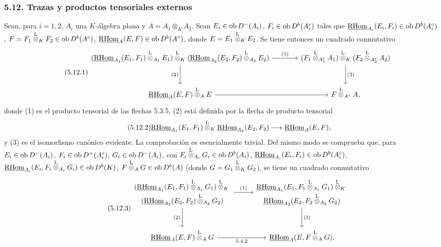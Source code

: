 \subsubsection*{5.12. Trazas y productos tensoriales externos}

Sean, para $i=1,2$, $A_i$ una $K$-álgebra plana y $A=A_1\otimes_KA_2$. Sean $E_i\in\operatorname{ob} D^-(A_i)$, $F_i\in\operatorname{ob} D^b(A_i^e)$ tales que $\underline{\mathrm{RHom}}_{A_i}(E_i,F_i)\in\operatorname{ob} D^b(A_i^\circ)$, $F=F_1\overset{\mathrm L}{\otimes}_KF_2\in\operatorname{ob} D^b(A^e)$, $\underline{\mathrm{RHom}}_A(E,F)\in\operatorname{ob} D^b(A^\circ)$, donde $E=E_1\overset{\mathrm L}{\otimes}_KE_2$. Se tiene entonces un cuadrado conmutativo
\begin{equation}\tag{5.12.1}
\begin{tikzcd}[column sep=large,row sep=large]
(\uRHom_{A_1}(E_1,F_1)\lten_{A_1}E_1)\lten_K(\uRHom_{A_2}(E_2,F_2)\lten_{A_2}E_2) \arrow[r,"(1)"] \arrow[d,"(2)"'] & (F_1\lten_{A_1^e}A_1)\lten_K(F_2\lten_{A_2^e}A_2) \arrow[d,"(3)"]\\
\uRHom_A(E,F)\lten_AE \arrow[r] & F\lten_{A^e}A,
\end{tikzcd}
\end{equation}
donde (1) es el producto tensorial de las flechas 5.3.5, (2) está definida por la flecha de producto tensorial
\begin{equation}\tag{5.12.2}
\underline{\mathrm{RHom}}_{A_1}(E_1,F_1)\overset{\mathrm L}{\otimes}_K\underline{\mathrm{RHom}}_{A_2}(E_2,F_2)\longrightarrow\underline{\mathrm{RHom}}_A(E,F),
\end{equation}
y (3) es el isomorfismo canónico evidente. La comprobación es esencialmente trivial. Del mismo modo se comprueba que, para $E_i\in\operatorname{ob} D^-(A_i)$, $F_i\in\operatorname{ob} D^+(A_i^e)$, $G_i\in\operatorname{ob} D^-(A_i)$, con $F_i\overset{\mathrm L}{\otimes}_{A_i}G_i\in\operatorname{ob} D^b(A_i)$, $\underline{\mathrm{RHom}}_{A_i}(E_i,F_i)\in\operatorname{ob} D^b(A_i^\circ)$, $\underline{\mathrm{RHom}}_{A_i}(E_i,F_i\overset{\mathrm L}{\otimes}_{A_i}G_i)\in\operatorname{ob} D^b(K)$, $F\overset{\mathrm L}{\otimes}_AG\in\operatorname{ob} D^b(A)$ (donde $G=G_1\overset{\mathrm L}{\otimes}_KG_2$), se tiene un cuadrado conmutativo
\begin{equation}\tag{5.12.3}
{\scriptstyle
\begin{tikzcd}[column sep=2.8em,row sep=large]
\begin{gathered}
(\uRHom_{A_1}(E_1,F_1)\lten_{A_1}G_1)\lten_K{}\\[-.15em]
(\uRHom_{A_2}(E_2,F_2)\lten_{A_2}G_2)
\end{gathered}
\arrow[r,"(1)"] \arrow[d,"(2)"']
&
\begin{gathered}
\uRHom_{A_1}(E_1,F_1\lten_{A_1}G_1)\lten_K{}\\[-.15em]
\uRHom_{A_2}(E_2,F_2\lten_{A_2}G_2)
\end{gathered}
\arrow[d,"(3)"]\\
\uRHom_A(E,F)\lten_AG \arrow[r,"5.4.2"'] & \uRHom_A(E,F\lten_AG),
\end{tikzcd}
}
\end{equation}
